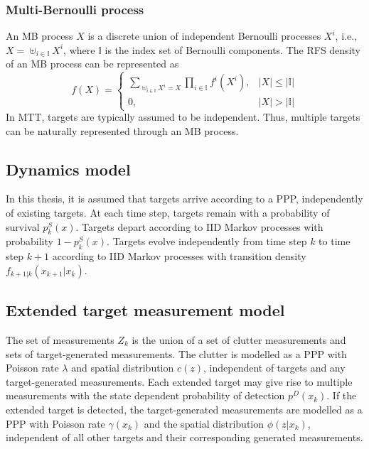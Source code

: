 \subsubsection{Multi-Bernoulli process}
An MB process $X$ is a discrete union of independent Bernoulli processes $X^i$, i.e., $X = \uplus_{i\in\mathbb{I}}X^i$, where $\mathbb{I}$ is the index set of Bernoulli components. The RFS density of an MB process can be represented as \cite{pmbmextended2}
\begin{equation}
f(X) = 
\begin{cases}
\sum_{\uplus_{i\in\mathbb{I}}X^i=X}\prod_{i\in\mathbb{I}}f^i(X^i), & |X| \leq |\mathbb{I}| \\
0, & |X| > |\mathbb{I}|
\end{cases}
\label{eq:mb}
\end{equation}
In MTT, targets are typically assumed to be independent. Thus, multiple targets can be naturally represented through an MB process. 


\subsection{Dynamics model}
In this thesis, it is assumed that targets arrive according to a PPP, independently of existing targets. At each time step, targets remain with a probability of survival $p^S_k(x)$. Targets depart according to IID Markov processes with probability $1-p^S_k(x)$. Targets evolve independently from time step $k$ to time step $k+1$ according to IID Markov processes with transition density $f_{k+1|k}(x_{k+1}|x_{k})$. 

\subsection{Extended target measurement model}
The set of measurements $Z_k$ is the union of a set of clutter measurements and sets of target-generated measurements. The clutter is modelled as a PPP with Poisson rate $\lambda$ and spatial distribution $c(z)$, independent of targets and any target-generated measurements. Each extended target may give rise to multiple measurements with the state dependent probability of detection $p^D(x_k)$. If the extended target is detected, the target-generated measurements are modelled as a PPP with Poisson rate $\gamma(x_k)$ and the spatial distribution $\phi(z|x_k)$, independent of all other targets and their corresponding generated measurements. 

